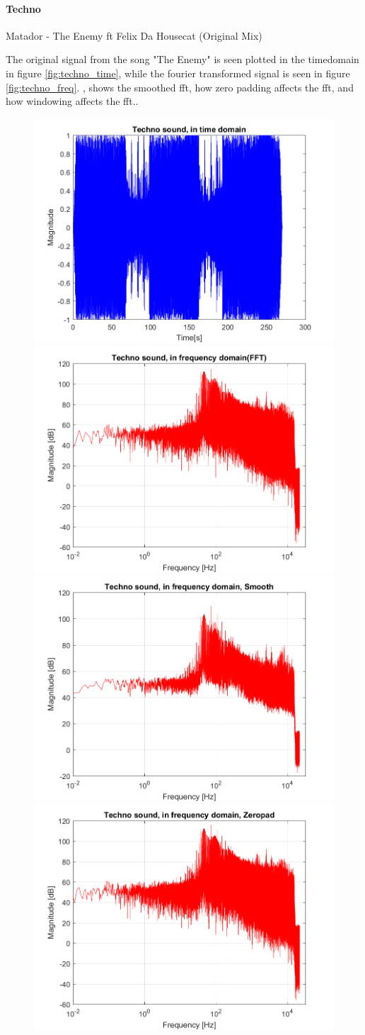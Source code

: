 \paragraph{Techno}
Matador - The Enemy ft Felix Da Housecat (Original Mix)

The original signal from the song "The Enemy" is seen plotted in the timedomain in figure \ref{fig:techno_time}, while the fourier transformed signal is seen in figure \ref{fig:techno_freq}. , shows the smoothed fft, how zero padding affects the fft, and how windowing affects the fft..

\begin{figure}[htb!]
	\centering
	{\includegraphics[width=0.45\linewidth]{code/Techno_figure1.png}}
	{\includegraphics[width=0.45\linewidth]{code/Techno_figure2.png}}
	{\includegraphics[width=0.45\linewidth]{code/Techno_figure3.png}}
	{\includegraphics[width=0.45\linewidth]{code/Techno_figure4.png}}

\end{figure}
